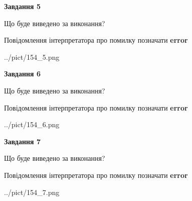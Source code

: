 \documentclass[10pt, ukrainian]{article}
\begin{document}
{\begin {large}
{\begin {center}\textbf{Завдання 5}\end {center}}\par
Що буде виведено за виконання? \par
Повідомлення інтерпретатора про помилку позначати \textbf{error}

\begin{center}
	{../pict/154_5.png}
\end{center}
\newpage

{\begin {center}\textbf{Завдання 6}\end {center}}\par
Що буде виведено за виконання? \par
Повідомлення інтерпретатора про помилку позначати \textbf{error}

\begin{center}
	{../pict/154_6.png}
\end{center}
\newpage

{\begin {center}\textbf{Завдання 7}\end {center}}\par
Що буде виведено за виконання? \par
Повідомлення інтерпретатора про помилку позначати \textbf{error}

\begin{center}
	{../pict/154_7.png}
\end{center}
\newpage

\end {large}}
\end{document}
